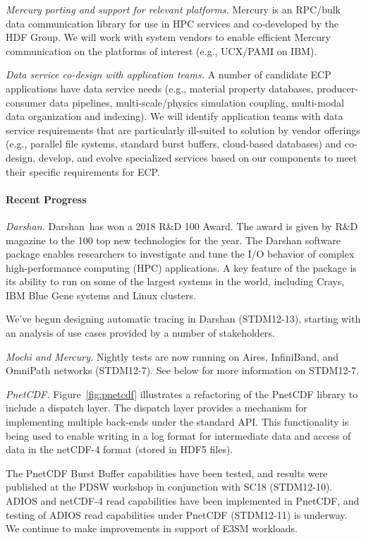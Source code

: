 \emph{Mercury porting and support for relevant platforms.}
Mercury is an RPC/bulk data communication library for use in HPC
services and co-developed by the HDF Group. We will work with system
vendors to enable efficient Mercury communication on the platforms of
interest (e.g., UCX/PAMI on IBM).

\emph{Data service co-design with application teams.}
A number of candidate ECP applications have data service needs (e.g.,
material property databases, producer-consumer data pipelines,
multi-scale/physics simulation coupling, multi-modal data organization
and indexing). We will identify application teams with data service
requirements that are particularly ill-suited to solution by vendor
offerings (e.g., parallel file systems, standard burst buffers,
cloud-based databases) and co-design, develop, and evolve specialized
services based on our components to meet their specific requirements
for ECP.

\paragraph{Recent Progress}

\emph{Darshan.}
Darshan has won a 2018 R&D 100 Award. The award is given by R&D magazine
to the 100 top new technologies for the year. The Darshan software
package enables researchers to investigate and tune the I/O behavior of
complex high-performance computing (HPC) applications. A key feature of
the package is its ability to run on some of the largest systems in the
world, including Crays, IBM Blue Gene systems and Linux clusters. 

We've begun designing automatic tracing in Darshan (STDM12-13), starting
with an analysis of use cases provided by a number of stakeholders.


\emph{Mochi and Mercury.}
Nightly tests are now running on Aires, InfiniBand, and OmniPath networks
(STDM12-7). See below for more information on STDM12-7.

\emph{PnetCDF.}
Figure~\ref{fig:pnetcdf} illustrates a refactoring of the PnetCDF
library to include a dispatch layer. The dispatch layer provides a
mechanism for implementing multiple back-ends under the standard
API. This functionality is being used to enable writing in a log
format for intermediate data and access of data in the netCDF-4 format
(stored in HDF5 files).

The PnetCDF Burst Buffer capabilities have been tested, and results were
published at the PDSW workshop in conjunction with SC18 (STDM12-10).
ADIOS and netCDF-4 read capabilities have been implemented in PnetCDF,
and testing of ADIOS read capabilities under PnetCDF (STDM12-11) is
underway.
%
We continue to make improvements in support of E3SM workloads.

